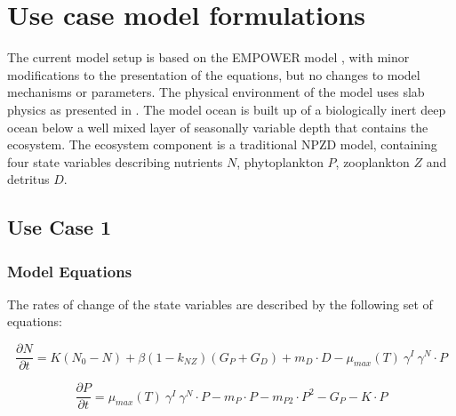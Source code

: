 \documentclass[journal abbreviation, manuscript]{copernicus}
\begin{document}
\appendix

\section{Use case model formulations}
The current model setup is based on the EMPOWER model \citep{Anderson2015c}, with minor modifications to the presentation of the equations, but no changes to model mechanisms or parameters.
The physical environment of the model uses slab physics as presented in \citet{Evans1985ACycles}. The model ocean is built up of a biologically inert deep ocean below a well mixed layer of seasonally variable depth that contains the ecosystem. The ecosystem component is a traditional NPZD model, containing four state variables describing nutrients $N$, phytoplankton $P$, zooplankton $Z$ and detritus $D$.
%
%
%
%
%
%

\subsection{Use Case 1}
\subsubsection{Model Equations}
The rates of change of the state variables are described by the following set of equations:

\begin{equation}
    \frac{\partial N}{\partial t} = 
    K (N_0 - N) %
    + \beta(1 - k_{NZ})(G_P + G_D) %
    + m_D \cdot D %
    - \mu_{max}(T) \  \gamma^{I} \ \gamma^{N} \cdot P %
\end{equation}

\begin{equation}
    \frac{\partial P}{\partial t} =
    \mu_{max}(T) \  \gamma^{I} \ \gamma^{N} \cdot P  %
    - m_P \cdot P %
    - m_{P2} \cdot P^2 %
    - G_P %
    - K \cdot P %
\end{equation}
\end{document}
